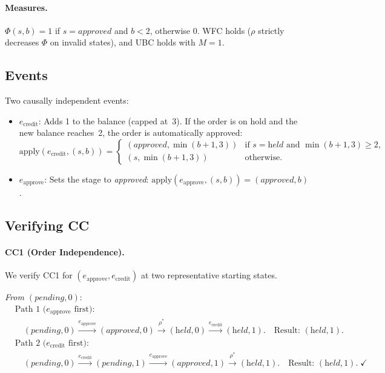 \documentclass[11pt,a4paper]{article}
\theoremstyle{plain}
\theoremstyle{definition}
\theoremstyle{remark}
\renewcommand{\_}{\textunderscore\allowbreak}
\begin{document}
\paragraph{Measures.}
$\Phi(s, b) = 1$ if $s = \textit{approved}$ and $b < 2$, otherwise $0$.
WFC holds ($\rho$ strictly decreases $\Phi$ on invalid states), and UBC holds
with $M = 1$.

\subsection{Events}

Two causally independent events:
\begin{itemize}[leftmargin=*,nosep]
\item $e_{\mathrm{credit}}$: Adds 1 to the balance (capped at~3).  If the
  order is on hold and the new balance reaches~2, the order is automatically
  approved:
  \[
  \mathrm{apply}(e_{\mathrm{credit}}, (s, b)) =
  \begin{cases}
  (\textit{approved}, \min(b{+}1, 3)) & \text{if } s = \textit{held} \text{ and } \min(b{+}1,3) \geq 2, \\
  (s, \min(b{+}1, 3)) & \text{otherwise.}
  \end{cases}
  \]
\item $e_{\mathrm{approve}}$: Sets the stage to \textit{approved}:
  $\mathrm{apply}(e_{\mathrm{approve}}, (s, b)) = (\textit{approved}, b)$.
\end{itemize}

\subsection{Verifying CC}

\paragraph{CC1 (Order Independence).}
We verify CC1 for $(e_{\mathrm{approve}}, e_{\mathrm{credit}})$ at two
representative starting states.

\emph{From $(\textit{pending}, 0)$}:
\begin{align*}
&\text{Path 1 ($e_{\mathrm{approve}}$ first):} \\
&\quad (\textit{pending}, 0) \xrightarrow{e_{\mathrm{approve}}}
  (\textit{approved}, 0) \xrightarrow{\rho^*} (\textit{held}, 0)
  \xrightarrow{e_{\mathrm{credit}}} (\textit{held}, 1).
  \quad\text{Result: } (\textit{held}, 1). \\[4pt]
&\text{Path 2 ($e_{\mathrm{credit}}$ first):} \\
&\quad (\textit{pending}, 0) \xrightarrow{e_{\mathrm{credit}}}
  (\textit{pending}, 1) \xrightarrow{e_{\mathrm{approve}}}
  (\textit{approved}, 1) \xrightarrow{\rho^*} (\textit{held}, 1).
  \quad\text{Result: } (\textit{held}, 1). \;\checkmark
\end{align*}
\end{document}
